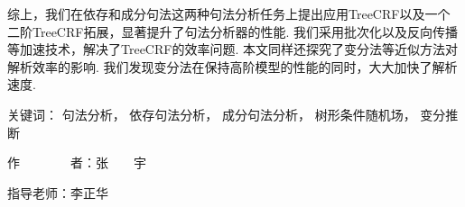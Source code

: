 \begin{cabstract}
\begin{enumerate}
	\end{enumerate}

	综上，我们在依存和成分句法这两种句法分析任务上提出应用TreeCRF以及一个二阶TreeCRF拓展，显著提升了句法分析器的性能.
	我们采用批次化以及反向传播等加速技术，解决了TreeCRF的效率问题.
	本文同样还探究了变分法等近似方法对解析效率的影响.
	我们发现变分法在保持高阶模型的性能的同时，大大加快了解析速度.

	\vskip 21bp
	{\heiti{} 关键词：}
	句法分析，
	依存句法分析，
	成分句法分析，
	树形条件随机场，
	变分推断

	\begin{flushright}
		作~~~~~~~~者：张~~~~宇

		指导老师：李正华

	\end{flushright}
\end{cabstract}


